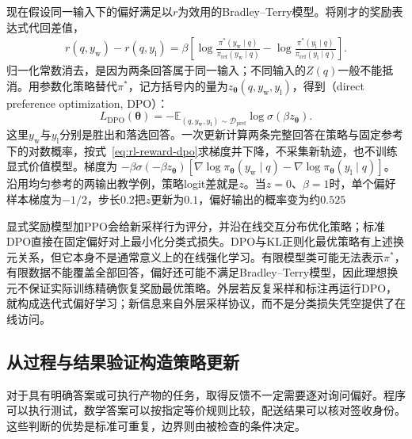 现在假设同一输入下的偏好满足以$r$为效用的Bradley--Terry模型。将刚才的奖励表达式代回差值，
\begin{equation}
  \begin{aligned}
    r(q,y_{\mathrm w})-r(q,y_{\mathrm l})
    =\beta\left[
      \log\frac{\pi^*(y_{\mathrm w}\mid q)}
                    {\pi_{\mathrm{ref}}(y_{\mathrm w}\mid q)}
      -\log\frac{\pi^*(y_{\mathrm l}\mid q)}
                    {\pi_{\mathrm{ref}}(y_{\mathrm l}\mid q)}
    \right].
  \end{aligned}
  \label{eq:rl-reward-dpo-change}
\end{equation}
归一化常数消去，是因为两条回答属于同一输入；不同输入的$Z(q)$一般不能抵消。用参数化策略替代$\pi^*$，记方括号内的量为$z_{\bm{\theta}}(q,y_{\mathrm w},y_{\mathrm l})$，得到（direct preference optimization, DPO）：
\begin{equation}
  L_{\mathrm{DPO}}(\bm{\theta})
  =-\mathbb E_{(q,y_{\mathrm w},y_{\mathrm l})\sim\mathcal D_{\mathrm{pref}}}
         \log\sigma\!\left(\beta z_{\bm{\theta}}\right).
  \label{eq:rl-reward-dpo}
\end{equation}
这里$y_{\mathrm w}$与$y_{\mathrm l}$分别是胜出和落选回答。一次更新计算两条完整回答在策略与固定参考下的对数概率，按式~\eqref{eq:rl-reward-dpo}求梯度并下降，不采集新轨迹，也不训练显式价值模型。梯度为
$-\beta\sigma(-\beta z_{\bm{\theta}})
[\nabla\log\pi_{\bm{\theta}}(y_{\mathrm w}\mid q)
-\nabla\log\pi_{\bm{\theta}}(y_{\mathrm l}\mid q)]$。
沿用均匀参考的两输出教学例，策略logit差就是$z$。当$z=0$、$\beta=1$时，单个偏好样本梯度为$-1/2$，步长$0.2$把$z$更新为$0.1$，偏好输出的概率变为约$0.525$

显式奖励模型加PPO会给新采样行为评分，并沿在线交互分布优化策略；标准DPO直接在固定偏好对上最小化分类式损失。DPO与KL正则化最优策略有上述换元关系，但它本身不是通常意义上的在线强化学习。有限模型类可能无法表示$\pi^*$，有限数据不能覆盖全部回答，偏好还可能不满足Bradley--Terry模型，因此理想换元不保证实际训练精确恢复奖励最优策略。外层若反复采样和标注再运行DPO，就构成迭代式偏好学习；新信息来自外层采样协议，而不是分类损失凭空提供了在线访问。

\subsection{从过程与结果验证构造策略更新}
\label{sec:rl-reward-verification}

对于具有明确答案或可执行产物的任务，取得反馈不一定需要逐对询问偏好。程序可以执行测试，数学答案可以按指定等价规则比较，配送结果可以核对签收身份。这些判断的优势是标准可重复，边界则由被检查的条件决定。

